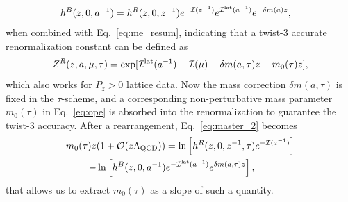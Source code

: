 \documentclass[prd,aps,nofootinbib,superscriptaddress,floatfix,preprintnumbers,twocolumn]{revtex4}
\begin{document}
\begin{align}
\label{eq:master_2}
    &h^B(z,0,a^{-1})=h^R(z,0,z^{-1})e^{\mathcal{-I}(z^{-1})}e^{\mathcal{I^{{\rm lat}}}(a^{-1})}e^{-\delta m(a) z},
\end{align}
when combined with Eq.~\eqref{eq:me_resum}, indicating that a twist-3 accurate renormalization constant can be defined as
\begin{align}
\label{eq:renorm}
    Z^R(z,a,\mu,\tau)=\exp[{\mathcal{I}^{{\rm lat}}(a^{-1})-\mathcal{I}(\mu)-\delta m (a,\tau) z-m_0(\tau)z}],
\end{align}
which also works for $P_z>0$ lattice data. Now the mass correction $\delta m (a,\tau)$ is fixed in the $\tau$-scheme, and a corresponding non-perturbative mass parameter $m_0(\tau)$ in Eq.~\eqref{eq:ope} is absorbed into the renormalization to guarantee the twist-3 accuracy.
After a rearrangement, Eq.~\eqref{eq:master_2} becomes
\begin{align}
\label{eq:master_3}
   m_0(\tau)z&(1+\mathcal{O}(z\Lambda_{\rm QCD}))=\ln\left[h^R(z,0,z^{-1},\tau)e^{\mathcal{-I}(z^{-1})}\right]\nonumber\\
   -&\ln \left[h^{B}(z,0,a^{-1})e^{-\mathcal{I}^{{\rm lat}}(a^{-1})}e^{\delta m(a,\tau) z}\right],
\end{align}
that allows us to extract $m_0(\tau)$ as a slope of such a quantity.
\end{document}
